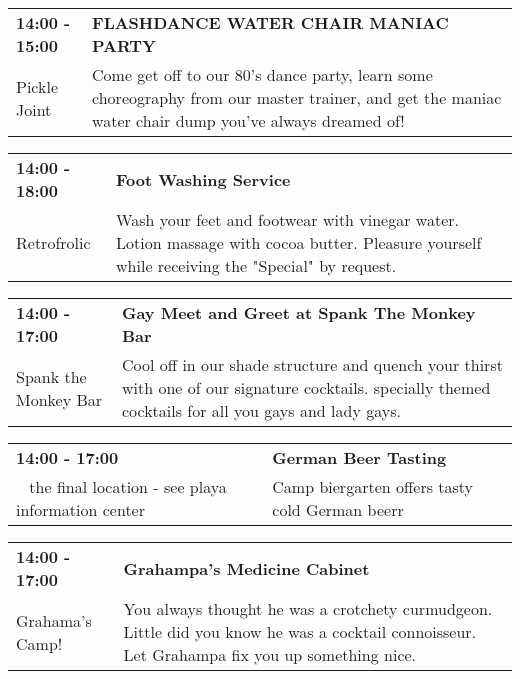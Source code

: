 \begin{tabular}{ p{1in} p{2.2in} }
    \textbf{14:00 - 15:00} & \textbf{FLASHDANCE WATER CHAIR MANIAC PARTY} \\
    Pickle Joint \newline  & Come get off to our 80's dance party, learn some choreography from our master trainer, and get the maniac water chair dump you've always dreamed of! \\
    \hline 
\end{tabular}
    
\begin{tabular}{ p{1in} p{2.2in} }
    \textbf{14:00 - 18:00} & \textbf{Foot Washing Service} \\
    Retrofrolic \newline  & Wash your feet and footwear with vinegar water.  Lotion massage with cocoa butter. Pleasure yourself while receiving the "Special" by request. \\
    \hline 
\end{tabular}
    
\begin{tabular}{ p{1in} p{2.2in} }
    \textbf{14:00 - 17:00} & \textbf{Gay Meet and Greet at Spank The Monkey Bar } \\
    Spank the Monkey Bar \newline  & Cool off in our shade structure and quench your thirst with one of our signature cocktails. specially themed cocktails for all you gays and lady gays. \\
    \hline 
\end{tabular}
    
\begin{tabular}{ p{1in} p{2.2in} }
    \textbf{14:00 - 17:00} & \textbf{German Beer Tasting} \\
    ~ \newline the final location - see playa information center & Camp biergarten offers tasty cold German beerr \\
    \hline 
\end{tabular}
    
\begin{tabular}{ p{1in} p{2.2in} }
    \textbf{14:00 - 17:00} & \textbf{Grahampa's Medicine Cabinet} \\
    Grahama's Camp! \newline  & You always thought he was a crotchety curmudgeon. Little did you know he was a cocktail connoisseur. Let Grahampa fix you up something nice. \\
    \hline 
\end{tabular}
    
